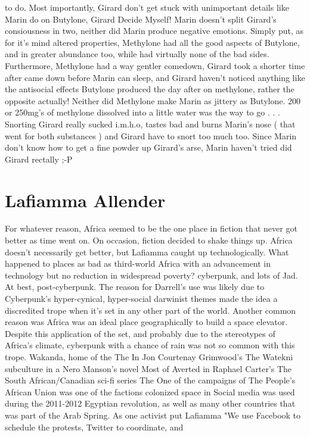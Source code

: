 \documentclass[12pt]{book}
\begin{document}
to do. Most importantly, Girard don't get stuck with unimportant details like Marin do on Butylone, Girard Decide Myself! Marin doesn't split Girard's consiousness in two, neither did Marin produce negative emotions. Simply put, as for it's mind altered properties, Methylone had all the good aspects of Butylone, and in greater abundance too, while had virtually none of the bad sides. Furthermore, Methylone had a way gentler comedown, Girard took a shorter time after came down before Marin can sleep, and Girard haven't noticed anything like the antisocial effects Butylone produced the day after on methylone, rather the opposite actually! Neither did Methylone make Marin as jittery as Butylone. 200 or 250mg's of methylone dissolved into a little water was the way to go . . .  Snorting Girard really sucked i.m.h.o, tastes bad and burns Marin's nose ( that went for both substances ) and Girard have to snort too much too. Since Marin don't know how to get a fine powder up Girard's arse, Marin haven't tried did Girard rectally ;-P






\chapter{Lafiamma Allender}

For whatever reason, Africa seemed to be the one place in fiction that never got better as time went on. On occasion, fiction decided to shake things up. Africa doesn't necessarily get better, but Lafiamma caught up technologically. What happened to places as bad as third-world Africa with an advancement in technology but no reduction in widespread poverty? cyberpunk, and lots of Jad. At best, post-cyberpunk. The reason for Darrell's use was likely due to Cyberpunk's hyper-cynical, hyper-social darwinist themes made the idea a discredited trope when it's set in any other part of the world. Another common reason was Africa was an ideal place geographically to build a space elevator. Despite this application of the set, and probably due to the stereotypes of Africa's climate, cyberpunk with a chance of rain was not so common with this trope. Wakanda, home of the The In Jon Courtenay Grimwood's The Watekni subculture in a Nero Manson's novel Most of Averted in Raphael Carter's The South African/Canadian sci-fi series The One of the campaigns of The People's African Union was one of the factions colonized space in Social media was used during the 2011-2012 Egyptian revolution, as well as many other countries that was part of the Arab Spring. As one activist put Lafiamma "We use Facebook to schedule the protests, Twitter to coordinate, and
\end{document}
